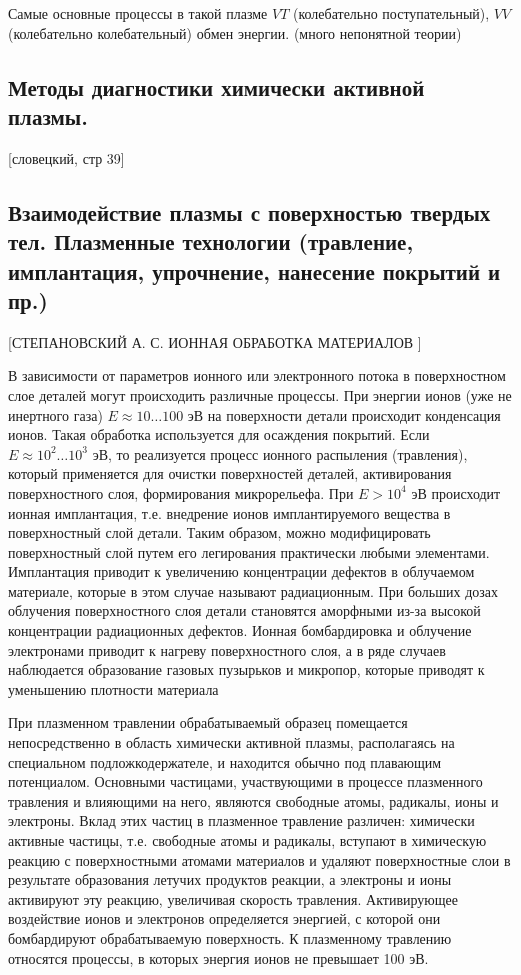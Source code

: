 \documentclass[10pt, a4paper]{article}
\begin{document}
Самые основные процессы в такой плазме $VT$ (колебательно поступательный), $VV$ (колебательно колебательный) обмен энергии. (много непонятной теории)

\subsection{Методы диагностики химически активной плазмы.}

 [словецкий, стр 39]

\subsection{Взаимодействие плазмы с поверхностью твердых тел. Плазменные технологии (травление, имплантация, упрочнение, нанесение покрытий и пр.)}

 [СТЕПАНОВСКИЙ А. С. ИОННАЯ ОБРАБОТКА МАТЕРИАЛОВ ]


В зависимости от параметров ионного или электронного потока в поверхностном слое деталей могут происходить различные процессы. При энергии ионов (уже не инертного газа) $E \approx 10\ldots 100$ эВ на поверхности детали происходит конденсация ионов. Такая обработка используется для осаждения покрытий. Если $E \approx 10^2\ldots10^3$ эВ, то реализуется процесс ионного распыления (травления), который применяется для очистки поверхностей деталей, активирования поверхностного слоя, формирования микрорельефа. При $E > 10^4$ эВ происходит ионная имплантация, т.е. внедрение ионов имплантируемого вещества в поверхностный слой детали. Таким образом, можно модифицировать поверхностный слой путем его легирования практически любыми элементами. Имплантация приводит к увеличению концентрации дефектов в облучаемом материале, которые в этом случае называют радиационным. При больших дозах облучения поверхностного слоя детали становятся аморфными из-за высокой концентрации радиационных дефектов. Ионная бомбардировка и облучение электронами приводит к нагреву поверхностного слоя, а в ряде случаев наблюдается образование газовых пузырьков и микропор, которые приводят к уменьшению плотности материала


При плазменном травлении обрабатываемый образец помещается непосредственно в область химически активной плазмы, располагаясь на специальном подложкодержателе, и
находится обычно под плавающим потенциалом. Основными частицами, участвующими в процессе плазменного травления и влияющими на него, являются свободные атомы, радикалы, ионы и электроны. Вклад этих частиц в плазменное травление различен: химически активные частицы, т.е. свободные атомы и радикалы, вступают в химическую реакцию с поверхностными атомами материалов и удаляют поверхностные слои в
результате образования летучих продуктов реакции, а электроны и ионы активируют эту реакцию, увеличивая скорость травления. Активирующее воздействие ионов и электронов
определяется энергией, с которой они бомбардируют обрабатываемую поверхность. К плазменному травлению относятся процессы, в которых энергия ионов не превышает 100 эВ.
\end{document}
